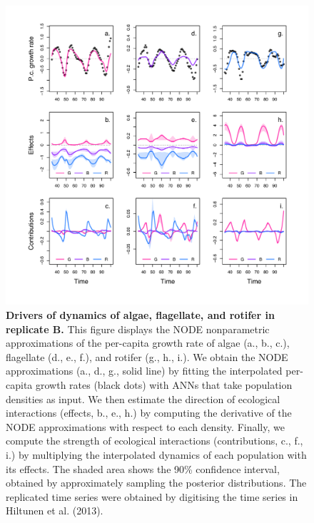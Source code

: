 \documentclass[11pt, oneside]{article}
\begin{document}
\newpage
\begin{figure}[H]
\begin{center}
\includegraphics[width=\linewidth]{figure_5.png}
\caption{
    \textbf{Drivers of dynamics of algae, flagellate, and rotifer in replicate B.}
    This figure displays the NODE nonparametric approximations of the per-capita growth rate of algae (a., b., c.), flagellate (d., e., f.), and rotifer (g., h., i.).
    We obtain the NODE approximations (a., d., g., solid line) by fitting the interpolated per-capita growth rates (black dots) with ANNs that take population densities as input.
    We then estimate the direction of ecological interactions (effects, b., e., h.) by computing the derivative of the NODE approximations with respect to each density.
    Finally, we compute the strength of ecological interactions (contributions, c., f., i.) by multiplying the interpolated dynamics of each population with its effects.
    The shaded area shows the 90\% confidence interval, obtained by approximately sampling the posterior distributions. 
    The replicated time series were obtained by digitising the time series in Hiltunen et al. (2013).
}
\end{center}
\end{figure}
\newpage
\end{document}
